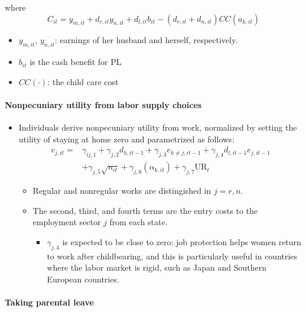 \documentclass[../root]{subfiles}
\begin{document}
    where
    \[
    C_{it} = y_{m, it} + d_{r, it} y_{n, it} + d_{l, it} b_{it} - (d_{r, it} + d_{n, it}) CC(a_{k, it})
    \]

    \begin{itemize}
      \item $y_{m, it}$, $y_{n, it}$: earnings of her husband and herself, respectively.
      \item $b_{it}$ is the cash benefit for PL
      \item $CC(\cdot)$: the child care cost
    \end{itemize}

    \paragraph{Nonpecuniary utility from labor supply choices}

    \begin{itemize}
      \item Individuals derive nonpecuniary utility from work, normalized by setting the utility of staying at home zero and parametrized as follows:
      \begin{align*}
        v_{j, it} = & \gamma_{ij, 1} + \gamma_{j, 2} d_{h, it-1} + \gamma_{j, 3} e_{k \neq j, it - 1} + \gamma_{j, 4} d_{l, it - 1} e_{j, it-1} \\
        &+ \gamma_{j, 5} \sqrt{n_{it}} + \gamma_{j, 6}(\alpha_{k, it}) + \gamma_{j, 7} \text{UR}_t
      \end{align*}
      \begin{itemize}
        \item Regular and nonregular works are distingished in $j = r, n$.
        \item The second, third, and fourth terms are the entry costs to the employment sector $j$ from each state.
        \begin{itemize}
          \item $\gamma_{j, 4}$ is expected to be close to zero: job protection helps women return to work after childbearing, and this is particularly useful in countries where the labor market is rigid, such as Japan and Southern European countries.
        \end{itemize}
      \end{itemize}
    \end{itemize}


    \paragraph{Taking parental leave}
\end{document}
